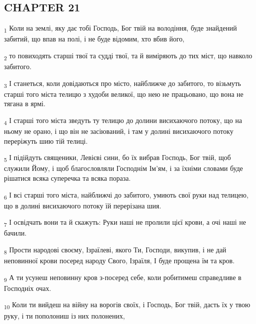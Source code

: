 \subsection{CHAPTER 21}
\begin{tcolorbox}
\textsubscript{1} Коли на землі, яку дає тобі Господь, Бог твій на володіння, буде знайдений забитий, що впав на полі, і не буде відомим, хто вбив його,
\end{tcolorbox}
\begin{tcolorbox}
\textsubscript{2} то повиходять старші твої та судді твої, та й виміряють до тих міст, що навколо забитого.
\end{tcolorbox}
\begin{tcolorbox}
\textsubscript{3} І станеться, коли довідаються про місто, найближче до забитого, то візьмуть старші того міста телицю з худоби великої, що нею не працьовано, що вона не тягана в ярмі.
\end{tcolorbox}
\begin{tcolorbox}
\textsubscript{4} І старші того міста зведуть ту телицю до долини висихаючого потоку, що на ньому не орано, і що він не засіюваний, і там у долині висихаючого потоку переріжуть шию тій телиці.
\end{tcolorbox}
\begin{tcolorbox}
\textsubscript{5} І підійдуть священики, Левієві сини, бо їх вибрав Господь, Бог твій, щоб служили Йому, і щоб благословляли Господнім Ім'ям, і за їхніми словами буде рішатися всяка суперечка та всяка пораза.
\end{tcolorbox}
\begin{tcolorbox}
\textsubscript{6} І всі старші того міста, найближчі до забитого, умиють свої руки над телицею, що в долині висихаючого потоку їй перерізана шия.
\end{tcolorbox}
\begin{tcolorbox}
\textsubscript{7} І освідчать вони та й скажуть: Руки наші не пролили цієї крови, а очі наші не бачили.
\end{tcolorbox}
\begin{tcolorbox}
\textsubscript{8} Прости народові своєму, Ізраїлеві, якого Ти, Господи, викупив, і не дай неповинної крови посеред народу Свого, Ізраїля, І буде прощена їм та кров.
\end{tcolorbox}
\begin{tcolorbox}
\textsubscript{9} А ти усунеш неповинну кров з-посеред себе, коли робитимеш справедливе в Господніх очах.
\end{tcolorbox}
\begin{tcolorbox}
\textsubscript{10} Коли ти вийдеш на війну на ворогів своїх, і Господь, Бог твій, дасть їх у твою руку, і ти пополониш із них полонених,
\end{tcolorbox}
